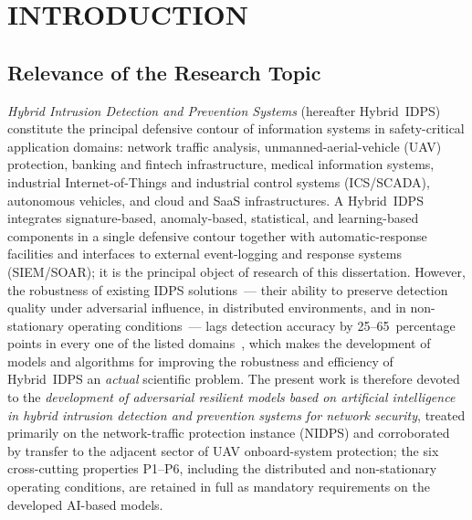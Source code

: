 
\chapter*{INTRODUCTION}

\section*{Relevance of the Research Topic}

\emph{Hybrid Intrusion Detection and Prevention Systems}
(hereafter Hybrid~IDPS) constitute the principal defensive contour
of information systems in safety-critical application domains:
network traffic analysis, unmanned-aerial-vehicle (UAV) protection,
banking and fintech infrastructure, medical information systems,
industrial Internet-of-Things and industrial control systems
(ICS/SCADA), autonomous vehicles, and cloud and SaaS
infrastructures. A Hybrid~IDPS integrates signature-based,
anomaly-based, statistical, and learning-based components in a
single defensive contour together with automatic-response
facilities and interfaces to external event-logging and response
systems (SIEM/SOAR); it is the principal object of research of
this dissertation. However, the robustness of existing
IDPS solutions~--- their ability to preserve detection quality
under adversarial influence, in distributed environments, and in
non-stationary operating conditions~--- lags detection accuracy by
25--65~percentage points in every one of the listed
domains~\cite{Zuegner2018,Bojchevski2019,Dai2018}, which makes the
development of models and algorithms for improving the robustness
and efficiency of Hybrid~IDPS an \emph{actual} scientific problem.
The present work is therefore devoted to the \emph{development of
adversarial resilient models based on artificial intelligence in
hybrid intrusion detection and prevention systems for network
security}, treated primarily on the network-traffic protection
instance (NIDPS) and corroborated by transfer to the adjacent
sector of UAV onboard-system protection; the six cross-cutting
properties P1--P6, including the distributed and non-stationary
operating conditions, are retained in full as mandatory
requirements on the developed AI-based models.

